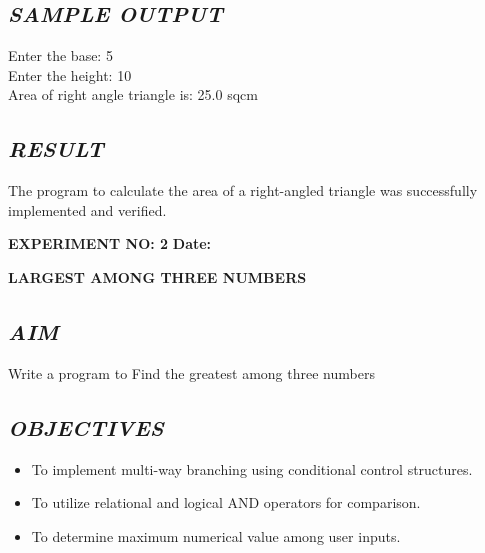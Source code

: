 \documentclass[11pt,a4paper]{article}
\begin{document}
\subsection*{\textit{SAMPLE OUTPUT}}
\begin{tcolorbox}[colback=black!85,colframe=navyblue,title=\textbf{Terminal Output},coltitle=white,fonttitle=\bfseries\small]
\small\ttfamily\color{green!30!white}
Enter the base: 5\\
Enter the height: 10\\
Area of right angle triangle is: 25.0 sqcm
\end{tcolorbox}

\subsection*{\textit{RESULT}}
The program to calculate the area of a right-angled triangle was successfully implemented and verified.

\newpage

\noindent
\textbf{\large EXPERIMENT NO: 2} \hfill \textbf{\large Date: \underline{\hspace{3cm}}}

\vspace{0.2cm}
\begin{center}
{\Huge \textbf{\textcolor{navyblue}{LARGEST AMONG THREE NUMBERS}}}
\end{center}
\vspace{0.3cm}

\subsection*{\textit{AIM}}
Write a program to Find the greatest among three numbers

\subsection*{\textit{OBJECTIVES}}
\begin{itemize}
  \item To implement multi-way branching using conditional control structures.
  \item To utilize relational and logical AND operators for comparison.
  \item To determine maximum numerical value among user inputs.
\end{itemize}
\end{document}
